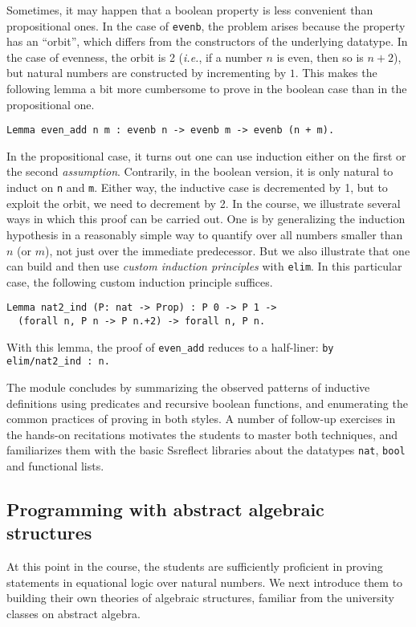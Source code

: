 \documentclass[blockstyle,preprint]{sigplanconf}
\newcommand{\is}[1]{\textcolor{blue}{(Ilya: {#1})}}
\newcommand{\an}[1]{\textcolor{red}{(Aleks: {#1})}}
\newcommand{\code}[1]{\lstinline{#1}}
\newcommand{\ie}{\emph{i.e.}\xspace}
\begin{document}
Sometimes, it may happen that a boolean property is less convenient
than propositional ones. In the case of \code{evenb}, the problem
arises because the property has an ``orbit'', which differs from the
constructors of the underlying datatype. In the case of evenness, the
orbit is 2 (\ie, if a number $n$ is even, then so is $n+2$), but
natural numbers are constructed by incrementing by $1$. This makes the
following lemma a bit more cumbersome to prove in the boolean case
than in the propositional one.
%
\begin{lstlisting}
Lemma even_add n m : evenb n -> evenb m -> evenb (n + m).
\end{lstlisting}
%
In the propositional case, it turns out one can use induction either
on the first or the second \emph{assumption}. Contrarily, in the
boolean version, it is only natural to induct on \code{n} and
\code{m}. Either way, the inductive case is decremented by 1, but to
exploit the orbit, we need to decrement by 2. In the course, we
illustrate several ways in which this proof can be carried out. One is
by generalizing the induction hypothesis in a reasonably simple way to
quantify over all numbers smaller than $n$ (or $m$), not just over the
immediate predecessor. But we also illustrate that one can build and
then use \emph{custom induction principles} with \code{elim}. In this
particular case, the following custom induction principle suffices.
%
\begin{lstlisting}
Lemma nat2_ind (P: nat -> Prop) : P 0 -> P 1 -> 
  (forall n, P n -> P n.+2) -> forall n, P n.
\end{lstlisting}
%
With this lemma, the proof of \code{even_add} reduces to a half-liner:
\code{by elim/nat2_ind : n.}

The module concludes by summarizing the observed patterns of inductive
definitions using predicates and recursive boolean functions, and
enumerating the common practices of proving in both styles. A number
of follow-up exercises in the hands-on recitations motivates the
students to master both techniques, and familiarizes them with the
basic Ssreflect libraries about the datatypes \code{nat}, \code{bool}
and functional lists.
%

\subsection{Programming with abstract algebraic structures}
\label{sec:depstruct}
At this point in the course, the students are sufficiently proficient
in proving statements in equational logic over natural numbers. We
next introduce them to building their own theories of algebraic
structures, familiar from the university classes on abstract algebra.
\end{document}
